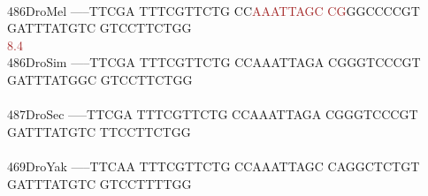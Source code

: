 \documentclass[11pt,twoside,reqno,a4paper]{article}
\begin{document}
{\\
486\hspace*{1\charwidth}DroMel	-----TTCGA	TTTCGTTCTG	CC\textcolor{brown}{A}\textcolor{brown}{A}\textcolor{brown}{A}\textcolor{brown}{T}\textcolor{brown}{T}\textcolor{brown}{A}\textcolor{brown}{G}\textcolor{brown}{C}	\textcolor{brown}{C}\textcolor{brown}{G}GGCCCCGT	GATTTATGTC	GTCCTTCTGG	\\
\hspace*{4\charwidth}\hspace*{7\charwidth}\hspace*{1\charwidth}\hspace*{1\charwidth}\hspace*{22\charwidth}\textcolor{brown}{8.4}\hspace*{1\charwidth}\hspace*{1\charwidth}\hspace*{1\charwidth}\hspace*{1\charwidth}\\
486\hspace*{1\charwidth}DroSim	-----TTCGA	TTTCGTTCTG	CCAAATTAGA	CGGGTCCCGT	GATTTATGGC	GTCCTTCTGG	\\
\hspace*{4\charwidth}\hspace*{7\charwidth}\hspace*{1\charwidth}\hspace*{1\charwidth}\hspace*{1\charwidth}\hspace*{1\charwidth}\hspace*{1\charwidth}\hspace*{1\charwidth}\\
487\hspace*{1\charwidth}DroSec	-----TTCGA	TTTCGTTCTG	CCAAATTAGA	CGGGTCCCGT	GATTTATGTC	TTCCTTCTGG	\\
\hspace*{4\charwidth}\hspace*{7\charwidth}\hspace*{1\charwidth}\hspace*{1\charwidth}\hspace*{1\charwidth}\hspace*{1\charwidth}\hspace*{1\charwidth}\hspace*{1\charwidth}\\
469\hspace*{1\charwidth}DroYak	-----TTCAA	TTTCGTTCTG	CCAAATTAGC	CAGGCTCTGT	GATTTATGTC	GTCCTTTTGG	\\
}
\end{document}
